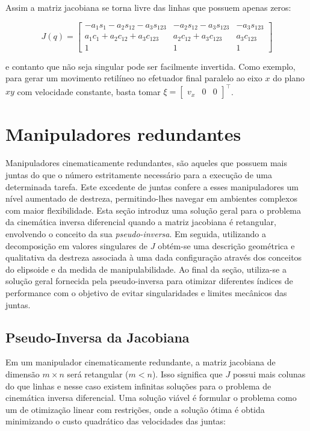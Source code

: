 Assim a matriz jacobiana se torna livre das linhas que possuem apenas zeros:

\begin{equation}
    J(q) = \begin{bmatrix}
        -a_1 s_1 - a_2 s_{12} - a_3 s_{123} & -a_2 s_{12} - a_3 s_{123} & -a_3 s_{123} \\
        a_1 c_1 + a_2 c_{12} + a_3 c_{123}  & a_2 c_{12} + a_3 c_{123}  & a_3 c_{123}  \\
        1                                   & 1                         & 1
    \end{bmatrix}
\end{equation}

e contanto que não seja singular pode ser facilmente invertida. Como exemplo, para gerar 
um movimento retilíneo no efetuador final paralelo
ao eixo \(x\) do plano \(xy\) com velocidade constante, basta tomar \(\xi = \begin{bmatrix}
    v_x & 0 & 0
\end{bmatrix}^\top\).

\section{Manipuladores redundantes}

Manipuladores cinematicamente redundantes, são aqueles que possuem mais juntas
do que o número estritamente necessário para a execução de uma determinada
tarefa. Este excedente de juntas confere a esses manipuladores um nível
aumentado de destreza, permitindo-lhes navegar em ambientes complexos com maior
flexibilidade. Esta seção introduz uma solução geral para o problema
da cinemática inversa diferencial quando a matriz jacobiana é retangular,
envolvendo o conceito da sua \emph{pseudo-inversa}. Em seguida, utilizando a
decomposição em valores singulares de \(J\) obtém-se uma descrição
geométrica e qualitativa da destreza associada à uma dada configuração através
dos conceitos do elipsoide e da medida de manipulabilidade. Ao final da seção,
utiliza-se a solução geral fornecida pela pseudo-inversa para
otimizar diferentes índices de performance com o objetivo de evitar
singularidades e limites mecânicos das juntas.

\subsection{Pseudo-Inversa da Jacobiana}

Em um manipulador cinematicamente redundante, a matriz jacobiana de dimensão \(m
\times n\) será retangular (\(m < n\)). Isso significa que \(J\) possui mais
colunas do que linhas e nesse caso existem infinitas soluções para o problema
de cinemática inversa diferencial. Uma solução viável é formular o problema como 
um de otimização linear com restrições, onde a solução ótima é obtida minimizando 
o custo quadrático das velocidades das juntas:

